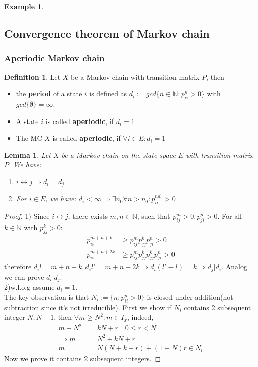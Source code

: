\documentclass[a4paper,11pt]{book}
\newtheorem{lemma}[theorem]{Lemma}
\theoremstyle{definition}
\newtheorem{definition}{Definition}[section]
\newtheorem*{example}{Example}
\theoremstyle{remark}
\begin{document}
\begin{example}
	
\end{example}





\subsection{Convergence theorem of Markov chain}
\subsubsection*{Aperiodic Markov chain}
\begin{definition}
	Let $X$ be a Markov chain with transition matrix $P$, then
	\begin{itemize}
		\item the \textbf{period} of a state $i$ is defined as $d_i:= gcd\{n \in \mathbb{N}: p_{ii}^n > 0 \}$ with $gcd\{\emptyset\} = \infty$.
		\item A state $i$ is called \textbf{aperiodic}, if $d_i = 1$ 
		\item The MC $X$ is called \textbf{aperiodic}, if $\forall i \in E: d_i = 1$
	\end{itemize}
\end{definition}

\begin{lemma}
	Let $X$ be a Markov chain on the state space $E$ with transition matrix $P$. We have:
	\begin{enumerate}
		\item $i \leftrightarrow j \Rightarrow d_i = d_j$
		\item For $i \in E$, we have: $d_i < \infty \Rightarrow \exists n_0 \forall n > n_0: p_{ii}^{nd_i} > 0$
	\end{enumerate}
\end{lemma}
\begin{proof}1)
	Since $i\leftrightarrow j$, there exists $m, n \in \mathbb{N}$, such that $p_{ij}^m > 0, p_{ji}^n>0$. For all $k \in \mathbb{N}$ with $p_{jj}^k >0:$
	\begin{align*}
		p_{ii}^{m + n + k} &\ge p_{ij}^m p_{jj}^k p_{ji}^n > 0\\
		p_{ii}^{m+n+2k} &\ge p_{ij}^m p_{jj}^k p_{jj}^k p_{ji}^n >0
	\end{align*}
	therefore $d_il = m+n+k, d_i l' = m + n + 2k \Rightarrow d_i (l'- l) = k \Rightarrow d_j | d_i$. Analog we can prove $d_i | d_j$.\\
	2)w.l.o.g assume $d_i = 1$.\\
	The key observation is that $N_i:= \{n: p_{ii}^n > 0\}$ is closed under addition(not subtraction since it's not irreducible). First we show if $N_i$ contains 2 subsequent integer $N, N+1$, then $\forall m \geq N^2: m \in I_x$, indeed,
	\begin{align*}
		m - N^2 &= kN + r \quad 0 \le r < N\\
		\Rightarrow 
		m &= N^2 + kN + r\\
		m &= N(N + k -r) + (1 + N) r \in N_i
	\end{align*}
	Now we prove it contains 2 subsequent integers. 
\end{proof}
\end{document}
